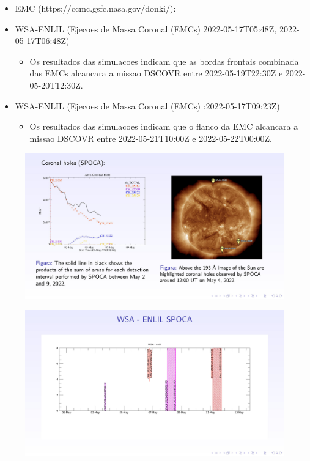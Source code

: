 \documentclass[a4paper, 10pt]{article}
\begin{document}
\begin{itemize} 
 \item EMC (https://ccmc.gsfc.nasa.gov/donki/):
\item WSA-ENLIL (Ejecoes de Massa Coronal (EMCs) 2022-05-17T05:48Z, 2022-05-17T06:48Z)
\begin{itemize} 
 \item Os resultados das simulacoes indicam que as bordas frontais combinada das EMCs alcancara a missao DSCOVR entre 2022-05-19T22:30Z e 2022-05-20T12:30Z.
\end{itemize} 
 \item WSA-ENLIL (Ejecoes de Massa Coronal (EMCs) :2022-05-17T09:23Z)
\begin{itemize} 
 \item Os resultados das simulacoes indicam que o flanco da EMC alcancara a missao DSCOVR entre 2022-05-21T10:00Z e 2022-05-22T00:00Z. 
\end{itemize} 
 \end{itemize} 
 
\begin{figure}[H]
    
                        \centering
   
                             \includegraphics[width=14cm]{./figures/pt_outfileSun_0.jpg}

                        \end{figure}

                     \begin{figure}[H]
    
                        \centering
   
                             \includegraphics[width=14cm]{./figures/pt_outfileSun_1.jpg}

                        \end{figure}
\end{document}

